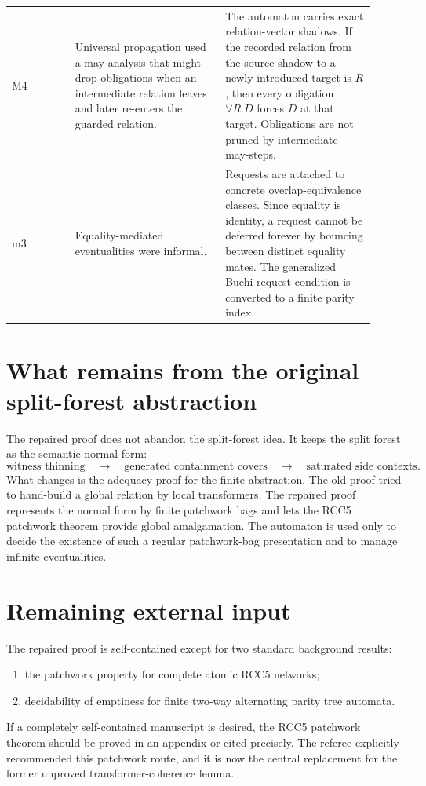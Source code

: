 \documentclass[11pt]{article}
\begin{document}
\begin{longtable}{p{0.16\linewidth}p{0.38\linewidth}p{0.38\linewidth}}
\addlinespace
M4 & Universal propagation used a may-analysis that might drop obligations when an
intermediate relation leaves and later re-enters the guarded relation. &
The automaton carries exact relation-vector shadows.  If the recorded relation from the
source shadow to a newly introduced target is $R$, then every obligation
$\forall R.D$ forces $D$ at that target.  Obligations are not pruned by intermediate
may-steps.\\
\addlinespace
m3 & Equality-mediated eventualities were informal. &
Requests are attached to concrete overlap-equivalence classes.  Since equality is
identity, a request cannot be deferred forever by bouncing between distinct equality
mates.  The generalized Buchi request condition is converted to a finite parity index.\\
\bottomrule
\end{longtable}

\section*{What remains from the original split-forest abstraction}

The repaired proof does not abandon the split-forest idea.  It keeps the split forest as
the semantic normal form:
\[
\text{witness thinning}\quad\to\quad\text{generated containment covers}\quad\to\quad
\text{saturated side contexts}.
\]
What changes is the adequacy proof for the finite abstraction.  The old proof tried to
hand-build a global relation by local transformers.  The repaired proof represents the
normal form by finite patchwork bags and lets the RCC5 patchwork theorem provide global
amalgamation.  The automaton is used only to decide the existence of such a regular
patchwork-bag presentation and to manage infinite eventualities.

\section*{Remaining external input}

The repaired proof is self-contained except for two standard background results:
\begin{enumerate}
\item the patchwork property for complete atomic RCC5 networks;
\item decidability of emptiness for finite two-way alternating parity tree automata.
\end{enumerate}
If a completely self-contained manuscript is desired, the RCC5 patchwork theorem should
be proved in an appendix or cited precisely.  The referee explicitly recommended this
patchwork route, and it is now the central replacement for the former unproved
transformer-coherence lemma.
\end{document}

